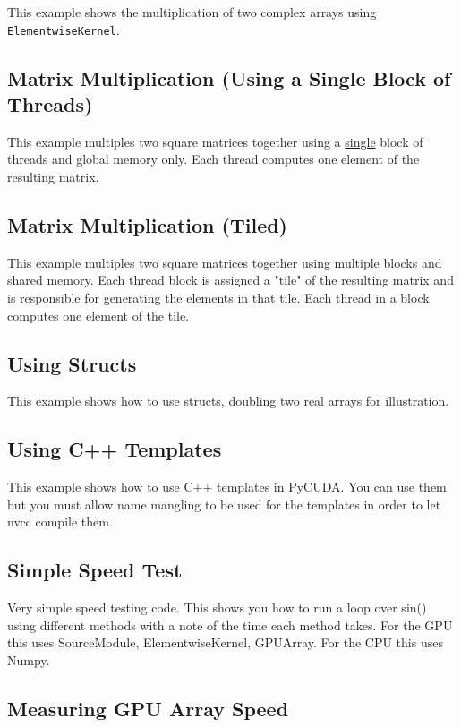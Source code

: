 \documentclass[article,A4,12pt]{llncs}
\begin{document}
This example shows the multiplication of two complex arrays using 
{\tt ElementwiseKernel}.  

\subsection{Matrix Multiplication (Using a Single Block of Threads)}

This example multiples two square matrices together using a \underline{single} block 
of threads and global memory only. Each thread computes one element of 
the resulting matrix.

\subsection{Matrix Multiplication (Tiled)}

This example multiples two square matrices together using multiple blocks and shared memory. Each thread block is assigned a "tile" of the resulting matrix and is responsible for generating the elements in that tile. Each thread in a block computes one element of the tile. 

\subsection{Using Structs}

This example shows how to use structs, doubling two real arrays for illustration.

\subsection{Using C++ Templates}

This example shows how to use C++ templates in PyCUDA.
You can use them but you must allow 
name mangling to be used for the templates in order to let nvcc 
compile them. 

\subsection{Simple Speed Test}

Very simple speed testing code. This shows you how to run a loop over sin() using different 
methods with a note of the time each method takes. For the GPU this uses SourceModule, 
ElementwiseKernel, GPUArray. For the CPU this uses Numpy.

\subsection{Measuring GPU Array Speed}
\end{document}
